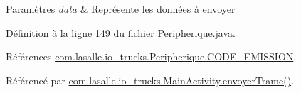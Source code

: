 \begin{DoxyParams}{Paramètres}
{\em data} & Représente les données à envoyer \\
\hline
\end{DoxyParams}


Définition à la ligne \hyperlink{_peripherique_8java_source_l00149}{149} du fichier \hyperlink{_peripherique_8java_source}{Peripherique.\+java}.



Références \hyperlink{_peripherique_8java_source_l00035}{com.\+lasalle.\+io\+\_\+trucks.\+Peripherique.\+C\+O\+D\+E\+\_\+\+E\+M\+I\+S\+S\+I\+ON}.



Référencé par \hyperlink{_main_activity_8java_source_l00242}{com.\+lasalle.\+io\+\_\+trucks.\+Main\+Activity.\+envoyer\+Trame()}.


